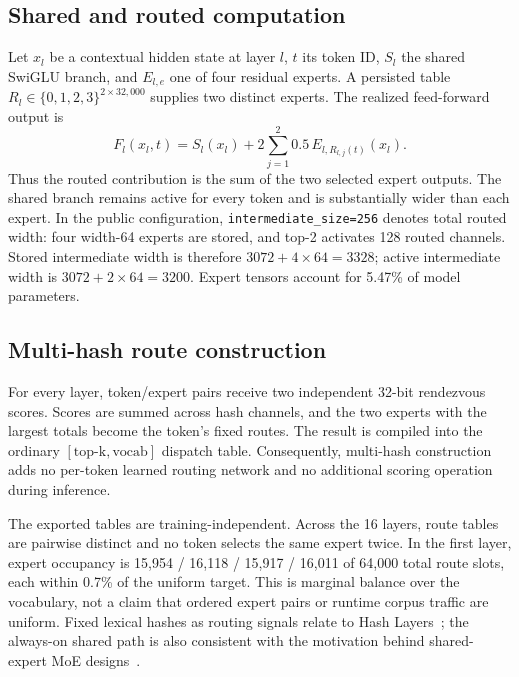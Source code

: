 \documentclass[10pt,twocolumn]{article}
\begin{document}
\subsection{Shared and routed computation}
Let $x_l$ be a contextual hidden state at layer $l$, $t$ its token ID, $S_l$ the shared SwiGLU branch, and $E_{l,e}$ one of four residual experts. A persisted table $R_l \in \{0,1,2,3\}^{2\times 32{,}000}$ supplies two distinct experts. The realized feed-forward output is
\begin{equation}
F_l(x_l,t)=S_l(x_l)+2\sum_{j=1}^{2}0.5\,E_{l,R_{l,j}(t)}(x_l).
\end{equation}
Thus the routed contribution is the sum of the two selected expert outputs. The shared branch remains active for every token and is substantially wider than each expert. In the public configuration, \texttt{intermediate\_size=256} denotes total routed width: four width-64 experts are stored, and top-2 activates 128 routed channels. Stored intermediate width is therefore $3072+4\times64=3328$; active intermediate width is $3072+2\times64=3200$. Expert tensors account for 5.47\% of model parameters.

\subsection{Multi-hash route construction}
For every layer, token/expert pairs receive two independent 32-bit rendezvous scores. Scores are summed across hash channels, and the two experts with the largest totals become the token's fixed routes. The result is compiled into the ordinary $[\mathrm{top\mbox{-}k},\mathrm{vocab}]$ dispatch table. Consequently, multi-hash construction adds no per-token learned routing network and no additional scoring operation during inference.

The exported tables are training-independent. Across the 16 layers, route tables are pairwise distinct and no token selects the same expert twice. In the first layer, expert occupancy is 15,954 / 16,118 / 15,917 / 16,011 of 64,000 total route slots, each within 0.7\% of the uniform target. This is marginal balance over the vocabulary, not a claim that ordered expert pairs or runtime corpus traffic are uniform. Fixed lexical hashes as routing signals relate to Hash Layers~\cite{roller2021hash}; the always-on shared path is also consistent with the motivation behind shared-expert MoE designs~\cite{dai2024deepseekmoe}.
\end{document}
